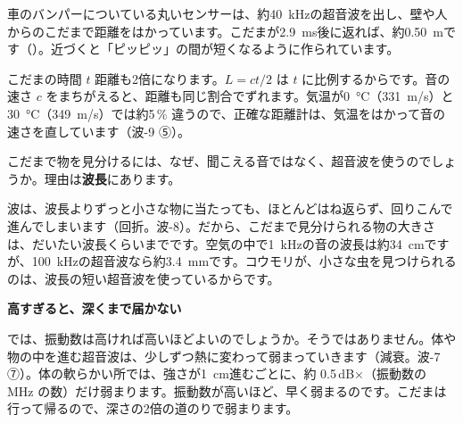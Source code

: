 \begin{phmijika}[車の後ろの障害物センサー]
車のバンパーについている丸いセンサーは、約\qty{40}{kHz}の超音波を出し、壁や人からのこだまで距離をはかっています。こだまが\qty{2.9}{ms}後に返れば、約\qty{0.50}{m}です（）。近づくと「ピッピッ」の間が短くなるように作られています。
\end{phmijika}

\begin{phbaisuru}{こだまの時間 $t$}
距離も2倍になります。$L=ct/2$ は $t$ に比例するからです。音の速さ $c$ をまちがえると、距離も同じ割合でずれます。気温が\qty{0}{\celsius}（\qty{331}{m/s}）と\qty{30}{\celsius}（\qty{349}{m/s}）では約5\,\% 違うので、正確な距離計は、気温をはかって音の速さを直しています（波-9 ⑤）。
\end{phbaisuru}


\leavevmode\label{ph:波-10:sec2}こだまで物を見分けるには、なぜ、聞こえる音ではなく、超音波を使うのでしょうか。理由は\textbf{波長}にあります。

波は、波長よりずっと小さな物に当たっても、ほとんどはね返らず、回りこんで進んでしまいます（回折。波-8）。だから、こだまで見分けられる物の大きさは、だいたい波長くらいまでです。空気の中で\qty{1}{kHz}の音の波長は約\qty{34}{cm}ですが、\qty{100}{kHz}の超音波なら約\qty{3.4}{mm}です。コウモリが、小さな虫を見つけられるのは、波長の短い超音波を使っているからです。

\noindent\textbf{高すぎると、深くまで届かない}\par\nobreak
では、振動数は高ければ高いほどよいのでしょうか。そうではありません。体や物の中を進む超音波は、少しずつ熱に変わって弱まっていきます（減衰。波-7 ⑦）。体の軟らかい所では、強さが\qty{1}{cm}進むごとに、約 0.5\,dB×（振動数の MHz の数）だけ弱まります。振動数が高いほど、早く弱まるのです。こだまは行って帰るので、深さの2倍の道のりで弱まります。

